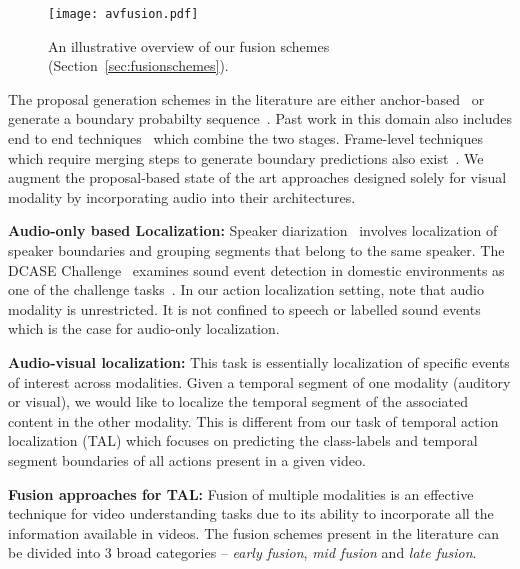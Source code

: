 \documentclass[10pt,twocolumn,letterpaper]{article}
\begin{document}
\begin{figure*}[!t]
    \centering
    \noindent
    \texttt{[image: avfusion.pdf]}
    \caption{An illustrative overview of our fusion schemes (Section~\ref{sec:fusionschemes}).}
    \label{fig:avfusion}
\end{figure*}

The proposal generation schemes in the literature are either anchor-based~\cite{DBLP:journals/corr/GaoYSCN17,DBLP:journals/corr/abs-1807-04821,DBLP:journals/corr/abs-1811-11524} or generate a boundary probabilty sequence~\cite{DBLP:journals/corr/abs-1806-02964,DBLP:journals/corr/abs-1907-09702,DBLP:journals/corr/abs-2009-07641}. Past work in this domain also includes end to end techniques~\cite{689ad8d461864d1b9f89ea6ecee65fe2,DBLP:journals/corr/YeungRMF15,DBLP:journals/corr/abs-1710-06236} which combine the two stages. Frame-level techniques which require merging steps to generate boundary predictions also exist~\cite{DBLP:journals/corr/ShouCZMC17,DBLP:journals/corr/MontesSN16,8737877}. We augment the proposal-based state of the art approaches designed solely for visual modality by incorporating audio into their architectures.

\noindent \textbf{Audio-only based Localization:} Speaker diarization~ \cite{8462628,8683892} involves localization of speaker boundaries and grouping segments that belong to the same speaker. The DCASE Challenge~\cite{DCASE2020Workshop} examines sound event detection in domestic environments as one of the challenge tasks~\cite{Miyazaki2020,Hao2020,Ebbers2020,Lin2019,Delphin-Poulat2019,Shi2019}. In our action localization setting, note that audio modality is unrestricted. It is not confined to speech or labelled sound events which is the case for audio-only localization.

\noindent \textbf{Audio-visual localization:} This task is essentially localization of specific events of interest across modalities. Given a temporal segment of one modality (auditory or visual), we would like to localize the temporal segment
of the associated content in the other modality. This is different from our task of temporal action localization (TAL) which focuses on predicting the class-labels and temporal segment boundaries of all actions present in a given video.

\noindent \textbf{Fusion approaches for TAL:} Fusion of multiple modalities is an effective technique for video understanding tasks due to its ability to incorporate all the information available in videos. The fusion schemes present in the literature can be divided into 3 broad categories -- \textit{early fusion}, \textit{mid fusion} and \textit{late fusion}. 
\end{document}
